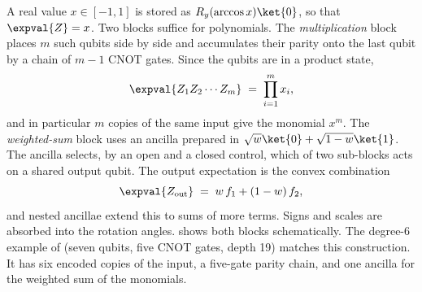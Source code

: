 A real value $x \in [-1,1]$ is stored as $R_y(\arccos x)\ket{0}$, so that $\expval{Z} = x$. Two blocks suffice for polynomials. The \emph{multiplication} block places $m$ such qubits side by side and accumulates their parity onto the last qubit by a chain of $m-1$ CNOT gates. Since the qubits are in a product state,
\begin{equation}\label{eq:qml:nnqa-mult}
\expval{Z_1 Z_2 \cdots Z_m} \;=\; \prod_{i=1}^{m} x_i,
\end{equation}
and in particular $m$ copies of the same input give the monomial $x^m$. The \emph{weighted-sum} block uses an ancilla prepared in $\sqrt{w}\ket{0} + \sqrt{1-w}\ket{1}$. The ancilla selects, by an open and a closed control, which of two sub-blocks acts on a shared output qubit. The output expectation is the convex combination
\begin{equation}\label{eq:qml:nnqa-sum}
\expval{Z_{\mathrm{out}}} \;=\; w\,f_1 + (1-w)\,f_2,
\end{equation}
and nested ancillae extend this to sums of more terms. Signs and scales are absorbed into the rotation angles.  shows both blocks schematically. The degree-6 example of \cite{guo2026nnqa} (seven qubits, five CNOT gates, depth 19) matches this construction. It has six encoded copies of the input, a five-gate parity chain, and one ancilla for the weighted sum of the monomials.

